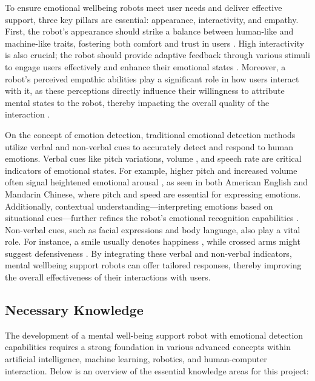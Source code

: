 To ensure emotional wellbeing robots meet user needs and deliver effective support, three key pillars
are essential: appearance, interactivity, and empathy. First, the robot’s appearance should strike a
balance between human-like and machine-like traits, fostering both comfort and trust in users \cite{10.1145/3640794.3665551}. High
interactivity is also crucial; the robot should provide adaptive feedback through various stimuli to engage
users effectively and enhance their emotional states \cite{Wang_2024}. Moreover, a robot’s perceived empathic abilities
play a significant role in how users interact with it, as these perceptions directly influence their willingness to attribute mental states to the robot, thereby impacting the overall quality of the interaction \cite{lillo2024investigatingrelationshipempathyattribution}.

On the concept of emotion detection, traditional emotional detection methods utilize verbal and
non-verbal cues to accurately detect and respond to human emotions. Verbal cues like pitch variations,
volume \cite{HAKANPAA2021570}, and speech rate \cite{app8122629} are critical indicators of emotional states. For example, higher pitch and increased volume often signal heightened emotional arousal \cite{RODERO2011e25}, as seen in both American English and
Mandarin Chinese, where pitch and speed are essential for expressing emotions. Additionally, contextual
understanding—interpreting emotions based on situational cues—further refines the robot’s emotional
recognition capabilities \cite{abbas2024context}. Non-verbal cues, such as facial expressions and body language, also play
a vital role. For instance, a smile usually denotes happiness \cite{chapre2023emotion}, while crossed arms might suggest
defensiveness \cite{liu2024emotiondetectionbodygesture}. By integrating these verbal and non-verbal indicators, mental wellbeing support
robots can offer tailored responses, thereby improving the overall effectiveness of their interactions with
users.

\subsection{Necessary Knowledge}

The development of a mental well-being support robot with emotional detection capabilities requires a strong foundation in various advanced concepts within artificial intelligence, machine learning, robotics, and human-computer interaction. Below is an overview of the essential knowledge areas for this project:

